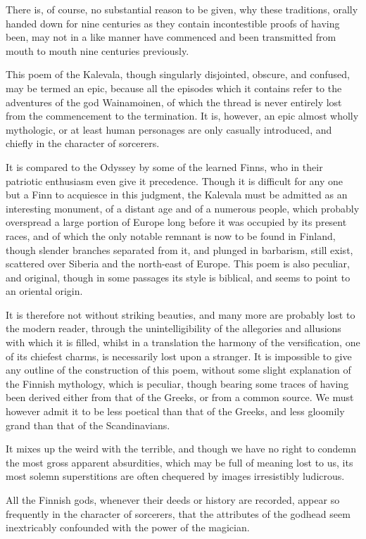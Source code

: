 \documentclass[10pt,a4paper]{article}
\begin{document}
There is, of course, no substantial reason to be given, why these traditions, orally handed down for nine centuries as they contain incontestible proofs of having been, may not in a like manner have commenced and been transmitted from mouth to mouth nine centuries previously.

This poem of the Kalevala, though singularly disjointed, obscure, and confused, may be termed an epic, because all the episodes which it contains refer to the adventures of the god Wainamoinen, of which the thread is never entirely lost from the commencement to the termination. It is, however, an epic almost wholly mythologic, or at least human personages are only casually introduced, and chiefly in the character of sorcerers.

It is compared to the Odyssey by some of the learned Finns, who in their patriotic enthusiasm even give it precedence. Though it is difficult for any one but a Finn to acquiesce in this judgment, the Kalevala must be admitted as an interesting monument, of a distant age and of a numerous people, which probably overspread a large portion of Europe long before it was occupied by its present races, and of which the only notable remnant is now to be found in Finland, though slender branches separated from it, and plunged in barbarism, still exist, scattered over Siberia and the north-east of Europe. This poem is also peculiar, and original, though in some passages its style is biblical, and seems to point to an oriental origin.

It is therefore not without striking beauties, and many more are probably lost to the modern reader, through the unintelligibility of the allegories and allusions with which it is filled, whilst in a translation the harmony of the versification, one of its chiefest charms, is necessarily lost upon a stranger. It is impossible to give any outline of the construction of this poem, without some slight explanation of the Finnish mythology, which is peculiar, though bearing some traces of having been derived either from that of the Greeks, or from a common source. We must however admit it to be less poetical than that of the Greeks, and less gloomily grand than that of the Scandinavians.

It mixes up the weird with the terrible, and though we have no right to condemn the most gross apparent absurdities, which may be full of meaning lost to us, its most solemn superstitions are often chequered by images irresistibly ludicrous.

All the Finnish gods, whenever their deeds or history are recorded, appear so frequently in the character of sorcerers, that the attributes of the godhead seem inextricably confounded with the power of the magician.
\end{document}
